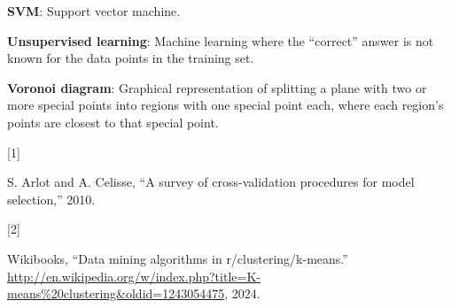 \documentclass[
]{book}
\newlength{\cslhangindent}
\newlength{\csllabelwidth}
\newenvironment{CSLReferences}[2] %
 {\begin{list}{}{%
  \setlength{\itemindent}{0pt}
  \setlength{\leftmargin}{0pt}
  \setlength{\parsep}{0pt}
  \ifodd #1
   \setlength{\leftmargin}{\cslhangindent}
   \setlength{\itemindent}{-1\cslhangindent}
  \fi
  \setlength{\itemsep}{#2\baselineskip}}}
 {\end{list}}
\newcommand{\CSLLeftMargin}[1]{\parbox[t]{\csllabelwidth}{\strut#1\strut}}
\newcommand{\CSLRightInline}[1]{\parbox[t]{\linewidth - \csllabelwidth}{\strut#1\strut}}
\begin{document}
\textbf{SVM}: Support vector machine.

\textbf{Unsupervised learning}: Machine learning where the ``correct'' answer is not known for the data points in the training set.

\textbf{Voronoi diagram}: Graphical representation of splitting a plane with two or more special points into regions with one special point each, where each region's points are closest to that special point.

\label{refs}
\begin{CSLReferences}{0}{0}
\CSLLeftMargin{{[}1{]} }%
\CSLRightInline{S. Arlot and A. Celisse, {``A survey of cross-validation procedures for model selection,''} 2010.}

\CSLLeftMargin{{[}2{]} }%
\CSLRightInline{Wikibooks, {``Data mining algorithms in r/clustering/k-means.''} \url{http://en.wikipedia.org/w/index.php?title=K-means\%20clustering&oldid=1243054475}, 2024.}

\end{CSLReferences}
\end{document}
